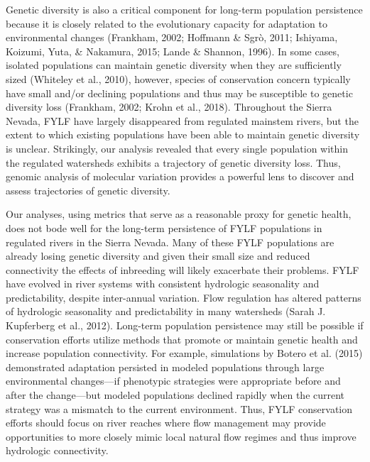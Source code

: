 \documentclass[twoside,12pt,final]{ucthesis-CA2012}
\begin{document}
\begin{ucmainmatter}
Genetic diversity is also a critical component for long-term population
persistence because it is closely related to the evolutionary capacity
for adaptation to environmental changes (Frankham, 2002; Hoffmann \&
Sgrò, 2011; Ishiyama, Koizumi, Yuta, \& Nakamura, 2015; Lande \&
Shannon, 1996). In some cases, isolated populations can maintain genetic
diversity when they are sufficiently sized (Whiteley et al., 2010),
however, species of conservation concern typically have small and/or
declining populations and thus may be susceptible to genetic diversity
loss (Frankham, 2002; Krohn et al., 2018). Throughout the Sierra Nevada,
FYLF have largely disappeared from regulated mainstem rivers, but the
extent to which existing populations have been able to maintain genetic
diversity is unclear. Strikingly, our analysis revealed that every
single population within the regulated watersheds exhibits a trajectory
of genetic diversity loss. Thus, genomic analysis of molecular variation
provides a powerful lens to discover and assess trajectories of genetic
diversity.

Our analyses, using metrics that serve as a reasonable proxy for genetic
health, does not bode well for the long-term persistence of FYLF
populations in regulated rivers in the Sierra Nevada. Many of these FYLF
populations are already losing genetic diversity and given their small
size and reduced connectivity the effects of inbreeding will likely
exacerbate their problems. FYLF have evolved in river systems with
consistent hydrologic seasonality and predictability, despite
inter-annual variation. Flow regulation has altered patterns of
hydrologic seasonality and predictability in many watersheds (Sarah J.
Kupferberg et al., 2012). Long-term population persistence may still be
possible if conservation efforts utilize methods that promote or
maintain genetic health and increase population connectivity. For
example, simulations by Botero et al. (2015) demonstrated adaptation
persisted in modeled populations through large environmental
changes---if phenotypic strategies were appropriate before and after the
change---but modeled populations declined rapidly when the current
strategy was a mismatch to the current environment. Thus, FYLF
conservation efforts should focus on river reaches where flow management
may provide opportunities to more closely mimic local natural flow
regimes and thus improve hydrologic connectivity.


\end{ucmainmatter}
\end{document}
